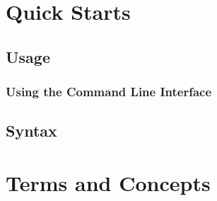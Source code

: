 \section{\hypertarget{_quick_starts}{Quick Starts}}
\subsection{\hypertarget{_usage}{Usage}}
\subsubsection{\hypertarget{_using_the_command_line_interface}{Using the Command Line Interface}}
\subsection{\hypertarget{_syntax}{Syntax}}
\section{\hypertarget{_terms_and_concepts}{Terms and Concepts}}
